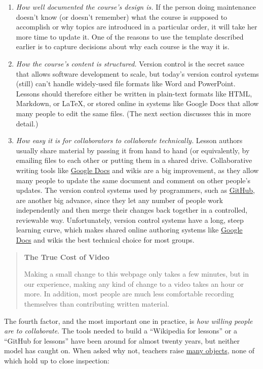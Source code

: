 \documentclass[10pt,statementpaper]{memoir}
\begin{document}
\begin{enumerate}
\def\labelenumi{\arabic{enumi}.}
\item
  \emph{How well documented the course's design is.} If the person doing
  maintenance doesn't know (or doesn't remember) what the course is
  supposed to accomplish or why topics are introduced in a particular
  order, it will take her more time to update it. One of the reasons to
  use the template described earlier is to capture decisions about why
  each course is the way it is.
\item
  \emph{How the course's content is structured.} Version control is the
  secret sauce that allows software development to scale, but today's
  version control systems (still) can't handle widely-used file formats
  like Word and PowerPoint. Lessons should therefore either be written
  in plain-text formats like HTML, Markdown, or LaTeX, or stored online
  in systems like Google Docs that allow many people to edit the same
  files. (The next section discusses this in more detail.)
\item
  \emph{How easy it is for collaborators to collaborate technically.}
  Lesson authors usually share material by passing it from hand to hand
  (or equivalently, by emailing files to each other or putting them in a
  shared drive. Collaborative writing tools like
  \href{http://docs.google.com}{Google Docs} and wikis are a big
  improvement, as they allow many people to update the same document and
  comment on other people's updates. The version control systems used by
  programmers, such as \href{http://github.com}{GitHub}, are another big
  advance, since they let any number of people work independently and
  then merge their changes back together in a controlled, reviewable
  way. Unfortunately, version control systems have a long, steep
  learning curve, which makes shared online authoring systems like
  \href{http://docs.google.com}{Google Docs} and wikis the best
  technical choice for most groups.
\end{enumerate}

\begin{quote}
\textbf{The True Cost of Video}

Making a small change to this webpage only takes a few minutes, but in
our experience, making any kind of change to a video takes an hour or
more. In addition, most people are much less comfortable recording
themselves than contributing written material.
\end{quote}

The fourth factor, and the most important one in practice, is \emph{how
willing people are to collaborate}. The tools needed to build a
``Wikipedia for lessons'' or a ``GitHub for lessons'' have been around
for almost twenty years, but neither model has caught on. When asked why
not, teachers raise
\href{http://blog.mrmeyer.com/2016/why-secondary-teachers-dont-want-a-github-for-lesson-plans/}{many
objects}, none of which hold up to close inspection:
\end{document}
